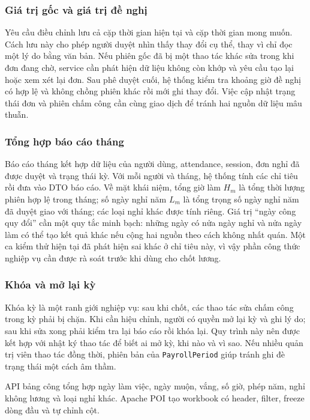 \documentclass[12pt,a4paper,oneside]{report}
\newcommand{\code}[1]{\texttt{#1}}
\begin{document}
\subsubsection{Giá trị gốc và giá trị đề nghị}
Yêu cầu điều chỉnh lưu cả cặp thời gian hiện tại và cặp thời gian mong muốn. Cách lưu này cho phép người duyệt nhìn thấy thay đổi cụ thể, thay vì chỉ đọc một lý do bằng văn bản. Nếu phiên gốc đã bị một thao tác khác sửa trong khi đơn đang chờ, service cần phát hiện dữ liệu không còn khớp và yêu cầu tạo lại hoặc xem xét lại đơn. Sau phê duyệt cuối, hệ thống kiểm tra khoảng giờ đề nghị có hợp lệ và không chồng phiên khác rồi mới ghi thay đổi. Việc cập nhật trạng thái đơn và phiên chấm công cần cùng giao dịch để tránh hai nguồn dữ liệu mâu thuẫn.

\subsubsection{Tổng hợp báo cáo tháng}
Báo cáo tháng kết hợp dữ liệu của người dùng, attendance, session, đơn nghỉ đã được duyệt và trạng thái kỳ. Với mỗi người và tháng, hệ thống tính các chỉ tiêu rồi đưa vào DTO báo cáo. Về mặt khái niệm, tổng giờ làm $H_m$ là tổng thời lượng phiên hợp lệ trong tháng; số ngày nghỉ năm $L_m$ là tổng trọng số ngày nghỉ năm đã duyệt giao với tháng; các loại nghỉ khác được tính riêng. Giá trị ``ngày công quy đổi'' cần một quy tắc minh bạch: những ngày có nửa ngày nghỉ và nửa ngày làm có thể tạo kết quả khác nếu cộng hai nguồn theo cách không nhất quán. Một ca kiểm thử hiện tại đã phát hiện sai khác ở chỉ tiêu này, vì vậy phần công thức nghiệp vụ cần được rà soát trước khi dùng cho chốt lương.

\subsubsection{Khóa và mở lại kỳ}
Khóa kỳ là một ranh giới nghiệp vụ: sau khi chốt, các thao tác sửa chấm công trong kỳ phải bị chặn. Khi cần hiệu chỉnh, người có quyền mở lại kỳ và ghi lý do; sau khi sửa xong phải kiểm tra lại báo cáo rồi khóa lại. Quy trình này nên được kết hợp với nhật ký thao tác để biết ai mở kỳ, khi nào và vì sao. Nếu nhiều quản trị viên thao tác đồng thời, phiên bản của \code{PayrollPeriod} giúp tránh ghi đè trạng thái một cách âm thầm.

API bảng công tổng hợp ngày làm việc, ngày muộn, vắng, số giờ, phép năm, nghỉ không lương và loại nghỉ khác. Apache POI tạo workbook có header, filter, freeze dòng đầu và tự chỉnh cột.
\end{document}

